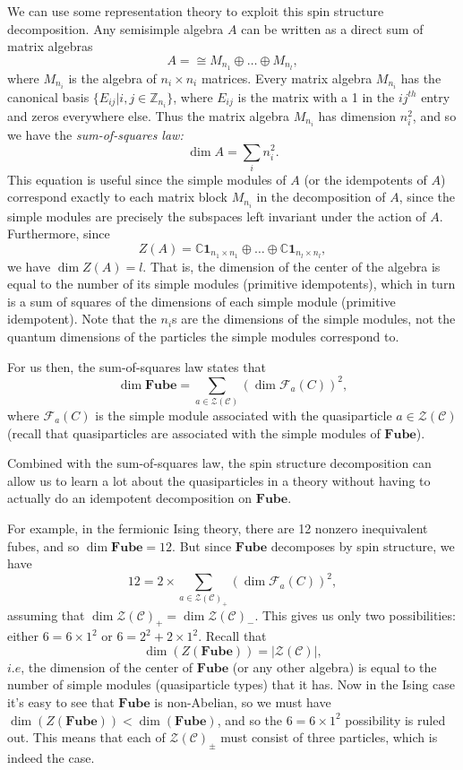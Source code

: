 \documentclass[12pt,a4paper]{article}
\newcommand{\unit}{\mathbf{1}}
\newcommand{\zz}{\mathbb{Z}}
\newcommand{\cc}{\mathbb{C}}
\newcommand\be            {\begin{equation}}
\newcommand\ee            {\end{equation}}
\newcommand{\zc}{\mathcal{Z}(\mathcal{C})}
\newcommand{\fube}{\textbf{Fube}}
\newcommand{\fld}{\mathcal{F}}
\begin{document}
We can use some representation theory to exploit this spin structure decomposition. Any semisimple algebra $A$ can be written as a direct sum of matrix algebras
\be A = \cong M_{n_1} \oplus \dots \oplus M_{n_l},\ee
where $M_{n_i}$ is the algebra of $n_i\times n_i$ matrices. Every matrix algebra $M_{n_i}$ has the canonical basis $\{E_{ij} | i,j\in \zz_{n_i}\}$, where $E_{ij}$ is the matrix with a 1 in the $ij^{th}$ entry and zeros everywhere else. Thus the matrix algebra $M_{n_i}$ has dimension $n_i^2$, and so we have the {\it sum-of-squares law:}
\be \dim A = \sum_i n_i^2.\ee
This equation is useful since the simple modules of $A$ (or the idempotents of $A$) correspond exactly to each matrix block $M_{n_i}$ in the decomposition of $A$, since the simple modules are precisely the subspaces left invariant under the action of $A$. Furthermore, since 
\be Z(A) = \cc \unit_{n_1\times n_1} \oplus \dots \oplus \cc \unit_{n_l\times n_l},\ee
we have $\dim Z(A) = l$. That is, the dimension of the center of the algebra is equal to the number of its simple modules (primitive idempotents), which in turn is a sum of squares of the dimensions of each simple module (primitive idempotent). Note that the $n_i$s are the dimensions of the simple modules, not the quantum dimensions of the particles the simple modules correspond to. 

For us then, the sum-of-squares law states that 
\be \dim \fube = \sum_{a\in \zc} (\dim \fld_a(C))^2,\ee
where $\fld_a(C)$ is the simple module associated with the quasiparticle $a \in \zc$ (recall that quasiparticles are associated with the simple modules of $\fube$).

 Combined with the sum-of-squares law, the spin structure decomposition can allow us to learn a lot about the quasiparticles in a theory without having to actually do an idempotent decomposition on $\fube$. 
 
 For example, in the fermionic Ising theory, there are 12 nonzero inequivalent fubes, and so $\dim \fube = 12$. But since $\fube$ decomposes by spin structure, we have 
 \be 12 = 2 \times \sum_{a\in \zc_+} (\dim \fld_a(C))^2,\ee
 assuming that $\dim \zc_+ = \dim\zc_-$. This gives us only two possibilities: either $6 = 6\times1^2$ or $6 = 2^2 + 2\times 1^2$. Recall that 
 \be \dim(Z(\fube)) = |\zc|,\ee
 $i.e$, the dimension of the center of $\fube$ (or any other algebra) is equal to the number of simple modules (quasiparticle types) that it has. Now in the Ising case it's easy to see that $\fube$ is non-Abelian, so we must have $\dim(Z(\fube)) < \dim(\fube)$, and so the $6 = 6\times1^2$ possibility is ruled out. This means that each of $\zc_\pm$ must consist of three particles, which is indeed the case. 
\end{document}
